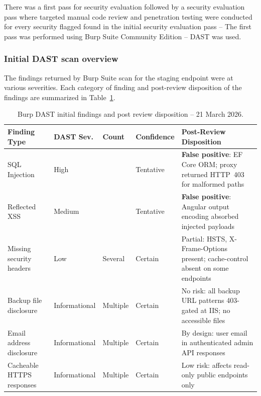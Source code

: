 There was a first pass for security evaluation followed by a security evaluation pass where targeted manual code review and penetration testing were conducted for every security flagged found in the initial security evaluation pass – The first pass was performed using Burp Suite Community Edition – DAST was used.

\subsubsection{Initial DAST scan overview}

The findings returned by Burp Suite scan for the staging endpoint were at various severities. Each category of finding and post-review disposition of the findings are summarized in Table~\ref{tab:dast-overview}.

\begin{table}[H]
  \vspace{2ex}
  \centering
  \footnotesize
  {%
  \setlength{\tabcolsep}{5pt}
  \renewcommand{\arraystretch}{1.3}
  \begin{tabular}{|>{\raggedright\arraybackslash}p{}|
                  >{\centering\arraybackslash}p{}|
                  >{\centering\arraybackslash}p{}|
                  >{\centering\arraybackslash}p{}|
                  >{\raggedright\arraybackslash}p{}|}
    \hline
    \textbf{Finding Type} & \textbf{DAST Sev.} & \textbf{Count} & \textbf{Confidence} & \textbf{Post-Review Disposition} \\
    \hline\hline
    SQL Injection & High & 4 & Tentative & \textbf{False positive}: EF Core ORM; proxy returned HTTP~403 for malformed paths \\
    \hline
    Reflected XSS & Medium & 1 & Tentative & \textbf{False positive}: Angular output encoding absorbed injected payloads \\
    \hline
    Missing security headers & Low & Several & Certain & Partial: HSTS, X-Frame-Options present; cache-control absent on some endpoints \\
    \hline
    Backup file disclosure & Informational & Multiple & Certain & No risk: all backup URL patterns 403-gated at IIS; no accessible files \\
    \hline
    Email address disclosure & Informational & Multiple & Certain & By design: user email in authenticated admin API responses \\
    \hline
    Cacheable HTTPS responses & Informational & Multiple & Certain & Low risk: affects read-only public endpoints only \\
    \hline
  \end{tabular}
  }%
  \vspace{2ex}
  \captionsetup{type=table}
  \caption{Burp DAST initial findings and post review disposition – 21 March 2026.}
  \label{tab:dast-overview}
\end{table}

